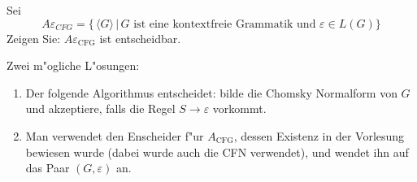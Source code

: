 Sei
\[
A\varepsilon_{CFG}=\{
\,\langle G\rangle\,|\,\text{$G$ ist eine kontextfreie Grammatik und $\varepsilon\in L(G)$}
\}
\]
Zeigen Sie: $A\varepsilon_{\text{CFG}}$ ist entscheidbar.

\begin{loesung}
Zwei m"ogliche L"osungen:
\begin{enumerate}
\item
Der folgende Algorithmus entscheidet: bilde die Chomsky Normalform von $G$
und akzeptiere, falls die Regel $S\to\varepsilon$ vorkommt.
\item
Man verwendet den Enscheider f"ur $A_{\text{CFG}}$, dessen
Existenz in der Vorlesung bewiesen wurde (dabei wurde auch die CFN
verwendet), und wendet ihn auf das Paar $(G,\varepsilon)$ an.
\end{enumerate}
\end{loesung}
